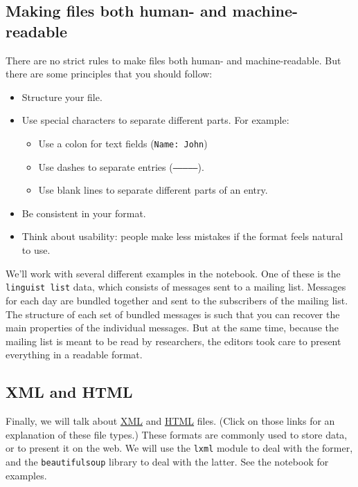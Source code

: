 \documentclass[12pt]{book}
\begin{document}
\subsection{Making files both human- and machine-readable}

There are no strict rules to make files both human- and machine-readable. But there are some principles that you should follow:

\begin{itemize}
\item Structure your file.
\item Use special characters to separate different parts. For example:

  \begin{itemize}
  \item Use a colon for text fields (\texttt{Name: John})
  \item Use dashes to separate entries (\texttt{--------------}).
  \item Use blank lines to separate different parts of an entry.
  \end{itemize}
\item Be consistent in your format.
\item Think about usability: people make less mistakes if the format feels natural to use.
\end{itemize}

We'll work with several different examples in the notebook. One of these is the \texttt{linguist list} data, which consists of messages sent to a mailing list. Messages for each day are bundled together and sent to the subscribers of the mailing list. The structure of each set of bundled messages is such that you can recover the main properties of the individual messages. But at the same time, because the mailing list is meant to be read by researchers, the editors took care to present everything in a readable format.

\subsection{XML and HTML}

Finally, we will talk about \href{https://en.wikipedia.org/wiki/XML}{XML} and \href{https://en.wikipedia.org/wiki/HTML}{HTML} files. (Click on those links for an explanation of these file types.) These formats are commonly used to store data, or to present it on the web. We will use the \texttt{lxml} module to deal with the former, and the \texttt{beautifulsoup} library to deal with the latter. See the notebook for examples.
\end{document}
